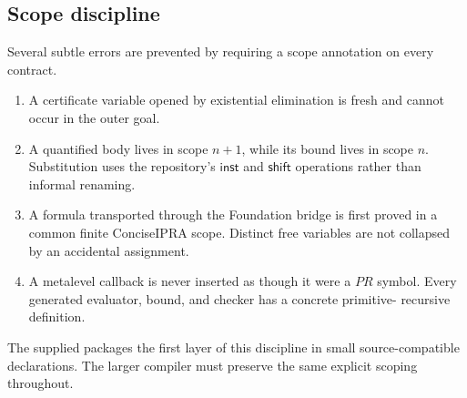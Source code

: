 \subsection{Scope discipline}

Several subtle errors are prevented by requiring a scope annotation on every
contract.

\begin{enumerate}
\item A certificate variable opened by existential elimination is fresh and
cannot occur in the outer goal.
\item A quantified body lives in scope \(n+1\), while its bound lives in scope
\(n\).  Substitution uses the repository's \(\mathsf{inst}\) and
\(\mathsf{shift}\) operations rather than informal renaming.
\item A formula transported through the Foundation bridge is first proved in a
common finite ConciseIPRA scope.  Distinct free variables are not collapsed by
an accidental assignment.
\item A metalevel callback is never inserted as though it were a \(PR\) symbol.
Every generated evaluator, bound, and checker has a concrete primitive-
recursive definition.
\end{enumerate}

The supplied  packages the first layer of this discipline in
small source-compatible declarations.  The larger compiler must preserve the
same explicit scoping throughout.
